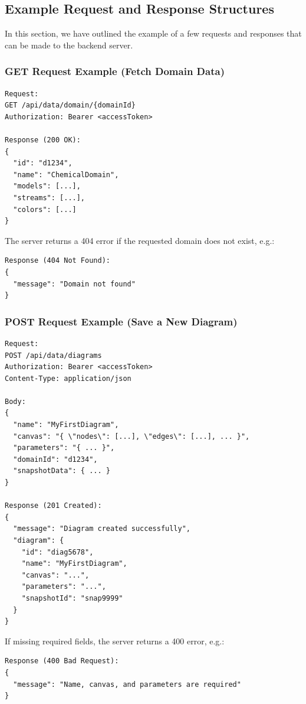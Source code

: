 \documentclass[12pt, titlepage]{article}
\begin{document}
\subsection{Example Request and Response Structures}

In this section, we have outlined the example of a few requests and responses that can be made to the backend server.

\subsubsection{GET Request Example (Fetch Domain Data)}

\begin{verbatim}
Request:
GET /api/data/domain/{domainId}
Authorization: Bearer <accessToken>

Response (200 OK):
{
  "id": "d1234",
  "name": "ChemicalDomain",
  "models": [...],
  "streams": [...],
  "colors": [...]
}
\end{verbatim}

\noindent
The server returns a 404 error if the requested domain does not exist, e.g.:
\begin{verbatim}
Response (404 Not Found):
{
  "message": "Domain not found"
}
\end{verbatim}

\subsubsection{POST Request Example (Save a New Diagram)}

\begin{verbatim}
Request:
POST /api/data/diagrams
Authorization: Bearer <accessToken>
Content-Type: application/json

Body:
{
  "name": "MyFirstDiagram",
  "canvas": "{ \"nodes\": [...], \"edges\": [...], ... }",
  "parameters": "{ ... }",
  "domainId": "d1234",
  "snapshotData": { ... }
}

Response (201 Created):
{
  "message": "Diagram created successfully",
  "diagram": {
    "id": "diag5678",
    "name": "MyFirstDiagram",
    "canvas": "...",
    "parameters": "...",
    "snapshotId": "snap9999"
  }
}
\end{verbatim}

\noindent
If missing required fields, the server returns a 400 error, e.g.:
\begin{verbatim}
Response (400 Bad Request):
{
  "message": "Name, canvas, and parameters are required"
}
\end{verbatim}
\end{document}

